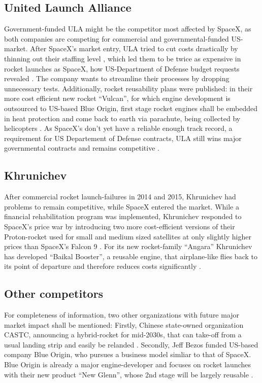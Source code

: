 \documentclass[11pt,a4paper]{article}
\begin{document}
\subsection{United Launch Alliance}\label{ula}
Government-funded ULA might be the competitor most affected by SpaceX, as both companies are competing for commercial and governmental-funded US-market. After SpaceX’s market entry, ULA tried to cut costs drastically by thinning out their staffing level \cite{scs47}, which led them  to be twice as expensive in rocket launches as SpaceX, how US-Department of Defense budget requests revealed \cite{scs48}. The company wants to streamline their processes by dropping unnecessary tests. Additionally, rocket reusability plans were published: in their more cost efficient new rocket “Vulcan”, for which engine development is outsourced to US-based Blue Origin, first stage rocket engines shall be embedded in heat protection and come back to earth via parachute, being collected by helicopters \cite{scs47,scs49}. As SpaceX’s don't yet have a reliable enough track record, a requirement for US Departement of Defense contracts, ULA still wins major governmental contracts and remains competitive \cite{scs50}.
\subsection{Khrunichev}\label{khrunichev}
After commercial rocket launch-failures in 2014 and 2015, Khrunichev had problems to remain competitive, while SpaceX entered the market. While a financial rehabilitation program was implemented, Khrunichev responded to SpaceX’s price war by introducing two more cost-efficient versions of their Proton-rocket used for small and medium sized satellites at only slightly higher prices than SpaceX’s Falcon 9 \cite{scs51}. For its new rocket-family “Angara” Khrunichev has developed “Baikal Booster”, a reusable engine, that airplane-like flies back to its point of departure and therefore reduces costs significantly \cite{scs53}.
\subsection{Other competitors}\label{other-companies}
For completeness of information, two other organizations with future major market impact shall be mentioned: Firstly, Chinese state-owned organization CASTC, announcing a hybrid-rocket for mid-2030s, that can take-off from a usual landing strip and easily be relanded \cite{scs55}. Secondly, Jeff Bezos funded US-based company Blue Origin, who pursues a business model simliar to that of SpaceX. Blue Origin is already a major engine-developer and focuses on rocket launches with their new product “New Glenn”, whose 2nd stage will be largely reusable \cite{scs56}.
\end{document}
